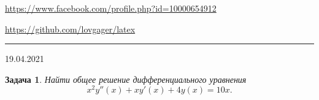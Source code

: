 \documentclass[12pt]{article}
\begin{document}


\begin{flushleft}
\url{https://www.facebook.com/profile.php?id=10000654912}

\url{https://github.com/lovgager/latex}
\end{flushleft}
\hrule 
\begin{flushright}
19.04.2021
\end{flushright}
\bigskip


\newtheorem*{task}{Задача}
\begin{task}
Найти общее решение дифференциального уравнения
\begin{equation*}
    x^2y''(x)+xy'(x)+4y(x)=10x.
\end{equation*}
\end{task}
\end{document}
